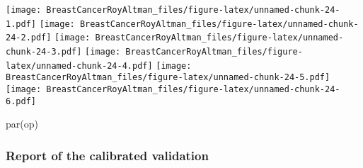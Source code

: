 \documentclass[
]{article}
\newenvironment{Shaded}{\begin{snugshade}}{\end{snugshade}}
\newcommand{\AttributeTok}[1]{\textcolor[rgb]{0.77,0.63,0.00}{#1}}
\newcommand{\FloatTok}[1]{\textcolor[rgb]{0.00,0.00,0.81}{#1}}
\newcommand{\FunctionTok}[1]{\textcolor[rgb]{0.00,0.00,0.00}{#1}}
\newcommand{\NormalTok}[1]{#1}
\newcommand{\OtherTok}[1]{\textcolor[rgb]{0.56,0.35,0.01}{#1}}
\newcommand{\SpecialCharTok}[1]{\textcolor[rgb]{0.00,0.00,0.00}{#1}}
\newcommand{\StringTok}[1]{\textcolor[rgb]{0.31,0.60,0.02}{#1}}
\begin{document}
\begin{Shaded}
\end{Shaded}

\texttt{[image: BreastCancerRoyAltman\_files/figure-latex/unnamed-chunk-24-1.pdf]}
\texttt{[image: BreastCancerRoyAltman\_files/figure-latex/unnamed-chunk-24-2.pdf]}
\texttt{[image: BreastCancerRoyAltman\_files/figure-latex/unnamed-chunk-24-3.pdf]}
\texttt{[image: BreastCancerRoyAltman\_files/figure-latex/unnamed-chunk-24-4.pdf]}
\texttt{[image: BreastCancerRoyAltman\_files/figure-latex/unnamed-chunk-24-5.pdf]}
\texttt{[image: BreastCancerRoyAltman\_files/figure-latex/unnamed-chunk-24-6.pdf]}

\begin{Shaded}
\begin{Highlighting}[]
\FunctionTok{par}\NormalTok{(op)}
\end{Highlighting}
\end{Shaded}

\hypertarget{report-of-the-calibrated-validation}{%
\subsubsection{Report of the calibrated
validation}\label{report-of-the-calibrated-validation}}

\begin{Shaded}
\end{Shaded}
\end{document}
